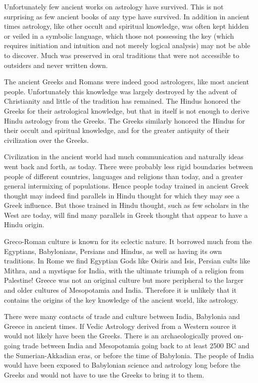  

Unfortunately few ancient works on astrology have survived. This is not surprising as few ancient books of any type have survived. In addition in ancient times astrology, like other occult and spiritual knowledge, was often kept hidden or veiled in a symbolic language, which those not possessing the key (which requires initiation and intuition and not merely logical analysis) may not be able to discover. Much was preserved in oral traditions that were not accessible to outsiders and never written down.

 

The ancient Greeks and Romans were indeed good astrologers, like most ancient people. Unfortunately this knowledge was largely destroyed by the advent of Christianity and little of the tradition has remained. The Hindus honored the Greeks for their astrological knowledge, but that in itself is not enough to derive Hindu astrology from the Greeks. The Greeks similarly honored the Hindus for their occult and spiritual knowledge, and for the greater antiquity of their civilization over the Greeks.

 

Civilization in the ancient world had much communication and naturally ideas went back and forth, as today. There were probably less rigid boundaries between people of different countries, languages and religions than today, and a greater general intermixing of populations. Hence people today trained in ancient Greek thought may indeed find parallels in Hindu thought for which they may see a Greek influence. But those trained in Hindu thought, such as few scholars in the West are today, will find many parallels in Greek thought that appear to have a Hindu origin.

 

Greco-Roman culture is known for its eclectic nature. It borrowed much from the Egyptians, Babylonians, Persians and Hindus, as well as having its own traditions. In Rome we find Egyptian Gods like Osiris and Isis, Persian cults like Mithra, and a mystique for India, with the ultimate triumph of a religion from Palestine! Greece was not an original culture but more peripheral to the larger and older cultures of Mesopotamia and India. Therefore it is unlikely that it contains the origins of the key knowledge of the ancient world, like astrology.

 

There were many contacts of trade and culture between India, Babylonia and Greece in ancient times. If Vedic Astrology derived from a Western source it would not likely have been the Greeks. There is an archaeologically proved on-going trade between India and Mesopotamia going back to at least 2500 BC and the Sumerian-Akkadian eras, or before the time of Babylonia. The people of India would have been exposed to Babylonian science and astrology long before the Greeks and would not have to use the Greeks to bring it to them.

